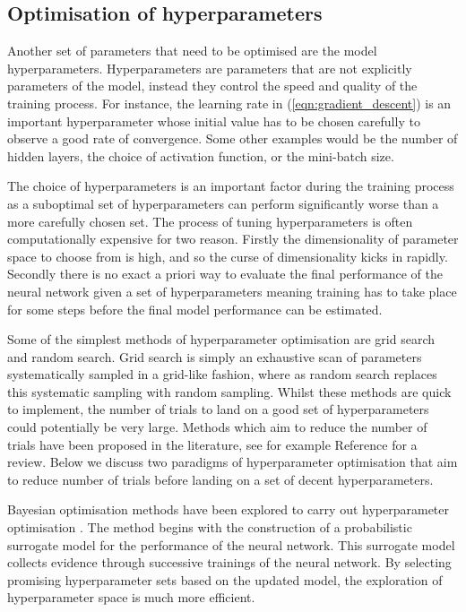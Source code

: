 \documentclass[main.tex]{subfiles}
\begin{document}
    \subsection{Optimisation of hyperparameters}
    Another set of parameters that need to be optimised
    are the model hyperparameters.
    Hyperparameters are parameters that are
    not explicitly parameters of the model, instead they control
    the speed and quality of the training process.
    For instance, the learning rate in ({\ref{eqn:gradient_descent}}) is
    an important hyperparameter whose initial value has
    to be chosen carefully to observe a good rate of convergence.
    Some other examples would be
    the number of hidden layers, the choice of activation
    function, or the mini-batch size.

    The choice of hyperparameters is an important
    factor during the training process as a suboptimal set
    of hyperparameters can perform significantly worse
    than a more carefully chosen set. The process of tuning
    hyperparameters is often computationally expensive for two
    reason. Firstly the dimensionality of parameter space to choose from is high,
    and so the curse of dimensionality kicks in rapidly.
    Secondly there is no exact a priori way to evaluate the
    final performance of the neural network given a set of
    hyperparameters meaning training has to take place for
    some steps before the final model performance can be estimated.
    
    Some of the simplest methods of hyperparameter optimisation
    are grid search and random search. Grid search is simply
    an exhaustive scan of parameters systematically sampled
    in a grid-like fashion, where as random search replaces
    this systematic sampling with random sampling. Whilst
    these methods are quick to implement, the number of trials
    to land on a good set of hyperparameters could potentially
    be very large. Methods which aim to reduce the number
    of trials have been proposed in the literature, see for example
    Reference \cite{Yu2020HyperParameterOA} for a review.
    Below we discuss two paradigms of hyperparameter optimisation
    that aim to reduce number of trials before landing
    on a set of decent hyperparameters.

    Bayesian optimisation methods have been explored
    to carry out hyperparameter optimisation \cite{bergstra2013making,bergstra2015hyperopt}.
    The method  begins with the construction of a probabilistic surrogate
    model for the performance of the neural network. This
    surrogate model collects evidence through successive trainings
    of the neural network. By selecting promising hyperparameter
    sets based on the updated model, the exploration of
    hyperparameter space is much more efficient.
\end{document}
